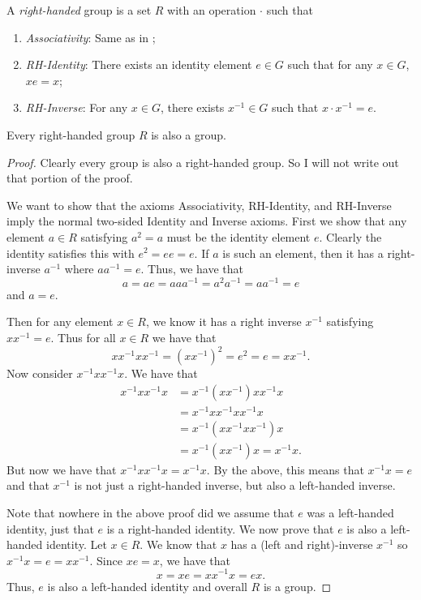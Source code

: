 \documentclass{article}
\begin{document}
\begin{defn}\label{defn:rh-grp}
  A \emph{right-handed} group is a set $R$ with an operation $\cdot$ such that
  \begin{enumerate}
  \item \emph{Associativity}: Same as in ;
  \item \emph{RH-Identity}: There exists an identity element $e \in G$ such that for any $x \in G$, $xe = x$;
  \item \emph{RH-Inverse}: For any $x \in G$, there exists $x^{-1} \in G$ such that $x \cdot x^{-1} = e$.
  \end{enumerate}
\end{defn}

\begin{theorem}\label{thrm:rh-grp_is_grp}
  Every right-handed group $R$ is also a group.
\end{theorem}

\begin{proof}
  Clearly every group is also a right-handed group.
  So I will not write out that portion of the proof.

  We want to show that the axioms Associativity, RH-Identity, and RH-Inverse imply the normal two-sided Identity and Inverse axioms.
  First we show that any element $a \in R$ satisfying $a^{2} = a$ must be the identity element $e$.
  Clearly the identity satisfies this with $e^{2} = ee = e$.
  If $a$ is such an element, then it has a right-inverse $a^{-1}$ where $a a^{-1} = e$.
  Thus, we have that
  \[
    a = ae = a a a^{-1} = a^{2} a^{-1} = a a^{-1} = e
  \]
  and $a = e$.

  Then for any element $x \in R$, we know it has a right inverse $x^{-1}$ satisfying $x x^{-1} = e$.
  Thus for all $x \in R$ we have that
  \[
    x x^{-1} x x^{-1} = \left(x x^{-1}\right)^{2} = e^{2} = e = x x^{-1}.
  \]
  Now consider $x^{-1} x x^{-1} x$.
  We have that
  \begin{align*}
    x^{-1} x x^{-1} x &= x^{-1} \left( x x^{-1} \right) x x^{-1} x \\
                      &= x^{-1} x x^{-1} x x^{-1} x \\
                      &= x^{-1} \left(x x^{-1} x x^{-1}\right) x \\
                      &= x^{-1} \left(x x^{-1}\right) x = x^{-1} x.
  \end{align*}
  But now we have that $x^{-1} x x^{-1} x = x^{-1} x$.
  By the above, this means that $x^{-1} x = e$ and that $x^{-1}$ is not just a right-handed inverse, but also a left-handed inverse.

  Note that nowhere in the above proof did we assume that $e$ was a left-handed identity, just that $e$ is a right-handed identity.
  We now prove that $e$ is also a left-handed identity.
  Let $x \in R$.
  We know that $x$ has a (left and right)-inverse $x^{-1}$ so $x^{-1} x = e = x x^{-1}$.
  Since $x e = x$, we have that
  \[
    x = x e = x x^{-1} x = e x.
  \]
  Thus, $e$ is also a left-handed identity and overall $R$ is a group.
\end{proof}
\end{document}
